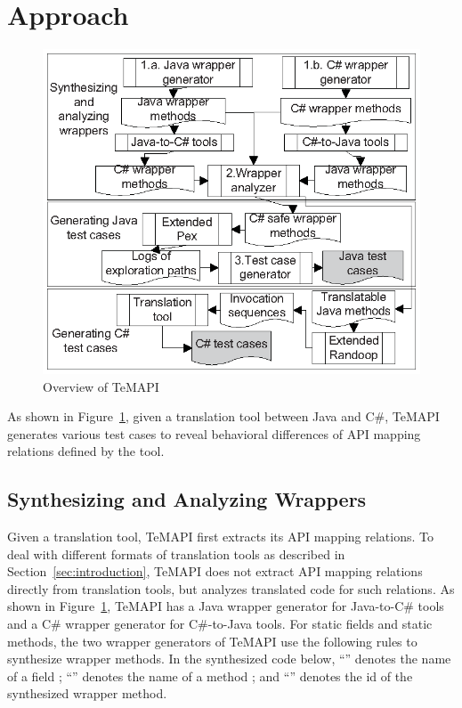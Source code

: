 \section{Approach}
\label{sec:approach}
\begin{figure}[t]
\centering
\includegraphics[scale=0.8,clip]{figure/approach.eps}\vspace*{-4ex}
 \caption{Overview of TeMAPI}\vspace*{-5ex}
 \label{fig:approach}
\end{figure}

As shown in Figure~\ref{fig:approach}, given a translation tool between Java and C\#, TeMAPI generates various test cases to reveal behavioral differences of API mapping relations defined by the tool.


\subsection{Synthesizing and Analyzing Wrappers}
\label{sec:approach:wrapper}

Given a translation tool, TeMAPI first extracts its API mapping relations. To deal with different formats of translation tools as described in Section~\ref{sec:introduction}, TeMAPI does not extract API mapping relations directly from translation tools, but analyzes translated code for such relations. As shown in Figure~\ref{fig:approach}, TeMAPI has a Java wrapper generator for Java-to-C\# tools and a C\# wrapper generator for C\#-to-Java tools. For static fields and static methods, the two wrapper generators of TeMAPI use the following rules to synthesize wrapper methods. In the synthesized code below, ``'' denotes the name of a field ; ``'' denotes the name of a method ; and ``'' denotes the id of the synthesized wrapper method.

